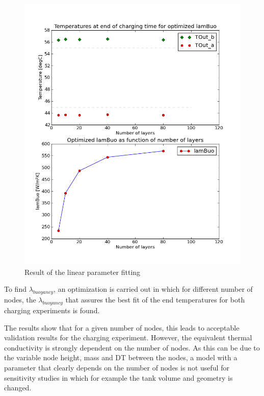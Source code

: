 \begin{figure}%
\begin{left}
\includegraphics[width=\columnwidth]{Thermal/images/Validation_Vitocell100V390l_ChargingTimeEndTemperatures_Linear.png}%
\caption{Result of the linear parameter fitting}%
\label{tankinternal}%
\end{left}
\end{figure}

To find $\lambda_{buoyancy}$, an optimization is carried out in which for different number of nodes, the $\lambda_{buoyancy}$ that assures the best fit of the end temperatures for both charging experiments is found.

The results show that for a given number of nodes, this leads to acceptable validation results for the charging experiment.  However, the equivalent thermal conductivity is strongly dependent on the number of nodes.  As this can be due to the variable node height, mass and DT between the nodes, a model with a parameter that clearly depends on the number of nodes is not useful for sensitivity studies in which for example the tank volume and geometry is changed.

